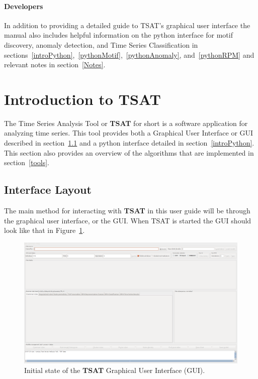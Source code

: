 \documentclass[titlepage, letterpaper, 12pt]{article}
\newcommand\TSAT{\textbf{TSAT}}
\begin{document}
\paragraph{Developers} In addition to providing a detailed guide to TSAT's graphical user interface the manual also includes helpful information on the python interface for motif discovery, anomaly detection, and Time Series Classification in sections~\ref{introPython},~\ref{pythonMotif},~\ref{pythonAnomaly}, and~\ref{pythonRPM} and relevant notes in section~\ref{Notes}. 

\section{Introduction to TSAT}
\label{intro}

The Time Series Analysis Tool or {\TSAT} for short is a software application for analyzing time series.  This tool provides both a Graphical User Interface or GUI described in section~\ref{GUI} and a python interface detailed in section~\ref{introPython}.  This section also provides an overview of the algorithms that are implemented in section~\ref{tools}.

\subsection{Interface Layout}
\label{GUI}
The main method for interacting with {\TSAT} in this user guide will be through the graphical user interface, or the GUI.  When TSAT is started the GUI should look like that in Figure~\ref{fig:tsat-interface}.

\begin{figure}[H]
	\includegraphics[width=\textwidth]{pictures/TSAT-interface}
	\caption{Initial state of the {\TSAT} Graphical User Interface (GUI).}
	\label{fig:tsat-interface}
\end{figure}
\end{document}

